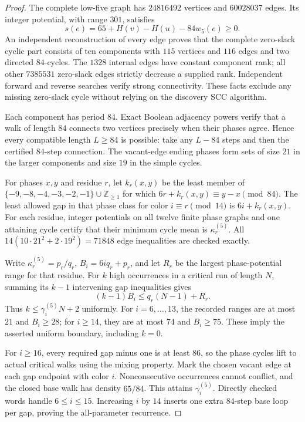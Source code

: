 \documentclass[10pt,a4paper]{amsart}
\begin{document}
\begin{proof}
The complete low-five graph has $24816492$ vertices and $60028037$
edges. Its integer potential, with range $301$, satisfies
\[
 s(e)=65+H(v)-H(u)-84w_5(e)\ge0.
\]
An independent reconstruction of every edge proves that the complete
zero-slack cyclic part consists of ten components with $115$ vertices
and $116$ edges and two directed $84$-cycles. The $1328$ internal
edges have constant component rank; all other $7385531$ zero-slack
edges strictly decrease a supplied rank. Independent forward and reverse
searches verify strong connectivity. These facts exclude any missing
zero-slack cycle without relying on the discovery SCC algorithm.

Each component has period $84$. Exact Boolean adjacency powers verify
that a walk of length $84$ connects two vertices precisely when their
phases agree. Hence every compatible length $L\ge84$ is possible:
take any $L-84$ steps and then the certified $84$-step connection.
The vacant-edge ending phases form sets of size $21$ in the larger
components and size $19$ in the simple cycles.

For phases $x,y$ and residue $r$, let $k_r(x,y)$ be the least member
of $\{-9,-8,-4,-3,-2,-1\}\cup\mathbb Z_{\ge1}$ for which
$6r+k_r(x,y)\equiv y-x\pmod{84}$. The least allowed gap in that
phase class for color $i\equiv r\pmod{14}$ is $6i+k_r(x,y)$.
For each residue, integer potentials on all twelve finite phase graphs
and one attaining cycle certify that their minimum cycle mean is
$\kappa^{(5)}_r$. All $14(10\cdot21^2+2\cdot19^2)=71848$ edge
inequalities are checked exactly.

Write $\kappa^{(5)}_r=p_r/q_r$, $B_i=6iq_r+p_r$, and let $R_r$ be the
largest phase-potential range for that residue. For $k$ high occurrences
in a critical run of length $N$, summing its $k-1$ intervening gap
inequalities gives
\[
 (k-1)B_i\le q_r(N-1)+R_r.
\]
Thus $k\le\gamma_i^{(5)}N+2$ uniformly. For $i=6,\ldots,13$,
the recorded ranges are at most $21$ and $B_i\ge28$; for $i\ge14$,
they are at most $74$ and $B_i\ge75$. These imply the asserted
uniform boundary, including $k=0$.

For $i\ge16$, every required gap minus one is at least $86$, so the
phase cycles lift to actual critical walks using the mixing property.
Mark the chosen vacant edge at each gap endpoint with color $i$.
Nonconsecutive occurrences cannot conflict, and the closed base walk
has density $65/84$. This attains $\gamma_i^{(5)}$. Directly checked
words handle $6\le i\le15$. Increasing $i$ by $14$ inserts one
extra $84$-step base loop per gap, proving the all-parameter recurrence.


\end{proof}
\end{document}
